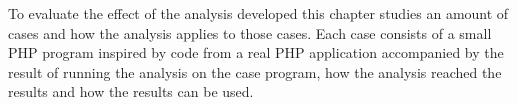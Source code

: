 To evaluate the effect of the analysis developed this chapter studies an amount of cases and how the analysis applies to those cases. Each case consists of a small PHP program inspired by code from a real PHP application accompanied by the result of running the analysis on the case program, how the analysis reached the results and how the results can be used.
